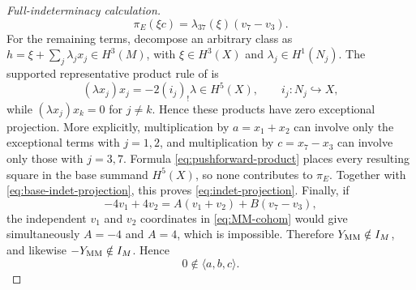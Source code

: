 \documentclass[11pt]{article}
\theoremstyle{remark}\newtheorem{remark}[theorem]{Remark}
\begin{document}
\begin{proof}[Full-indeterminacy calculation]
\begin{equation}
\pi_E(\xi c)=\lambda_{37}(\xi)(v_7-v_3).
\end{equation}
For the remaining terms, decompose an arbitrary class as
$h=\xi+\sum_j\lambda_jx_j\in H^3(M)$, with
$\xi\in H^3(X)$ and $\lambda_j\in H^1(N_j)$.  The supported representative
product rule of \cite[Section 3]{MM} is
\begin{equation}\label{eq:pushforward-product}
(\lambda x_j)x_j=-2(i_j)_!\lambda\in H^5(X),
\qquad i_j:N_j\hookrightarrow X,
\end{equation}
while $(\lambda x_j)x_k=0$ for $j\ne k$.  Hence these products have zero
exceptional projection.  More explicitly, multiplication by
$a=x_1+x_2$ can involve only the exceptional terms with $j=1,2$, and
multiplication by $c=x_7-x_3$ can involve only those with $j=3,7$.
Formula \eqref{eq:pushforward-product} places every resulting square in
the base summand $H^5(X)$, so none contributes to $\pi_E$.  Together with
\eqref{eq:base-indet-projection}, this proves
\eqref{eq:indet-projection}.  Finally, if
\[
-4v_1+4v_2=A(v_1+v_2)+B(v_7-v_3),
\]
the independent $v_1$ and $v_2$ coordinates in \eqref{eq:MM-cohom} would
give simultaneously $A=-4$ and $A=4$, which is impossible.  Therefore
$Y_{\rm MM}\notin I_M$, and likewise $-Y_{\rm MM}\notin I_M$.  Hence
\[
 0\notin\langle a,b,c\rangle.
\]
\end{proof}
\end{document}
